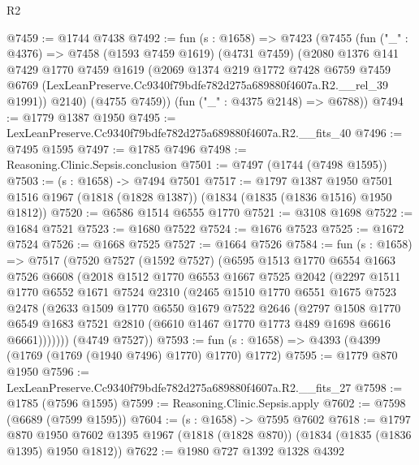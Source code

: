 \begin{lexlean}{R2}
\begin{coremodule}
@7459 := @1744 @7438
@7492 := fun (s : @1658) =>
  @7423
    (@7455
      (fun ("_" : @4376) =>
      @7458
        (@1593 @7459 @1619)
        (@4731 @7459)
        (@2080
          @1376
          @141
          @7429
          @1770
          @7459
          @1619
          (@2069
            @1374
            @219
            @1772
            @7428
            @6759
            @7459
            @6769
            (LexLeanPreserve.Cc9340f79bdfe782d275a689880f4607a.R2.__rel_39 @1991))
          @2140)
        (@4755 @7459))
      (fun ("_" : @4375 @2148) => @6788))
@7494 := @1779 @1387 @1950
@7495 := LexLeanPreserve.Cc9340f79bdfe782d275a689880f4607a.R2.__fits_40
@7496 := @7495 @1595
@7497 := @1785 @7496
@7498 := Reasoning.Clinic.Sepsis.conclusion
@7501 := @7497 (@1744 (@7498 @1595))
@7503 := (s : @1658) -> @7494 @7501
@7517 := @1797
    @1387
    @1950
    @7501
    @1516
    @1967
    (@1818 (@1828 @1387))
    (@1834 (@1835 (@1836 @1516) @1950 @1812))
@7520 := @6586 @1514 @6555 @1770
@7521 := @3108 @1698
@7522 := @1684 @7521
@7523 := @1680 @7522
@7524 := @1676 @7523
@7525 := @1672 @7524
@7526 := @1668 @7525
@7527 := @1664 @7526
@7584 := fun (s : @1658) =>
  @7517
    (@7520
      @7527
      (@1592 @7527)
      (@6595
        @1513
        @1770
        @6554
        @1663
        @7526
        @6608
        (@2018
          @1512
          @1770
          @6553
          @1667
          @7525
          @2042
          (@2297
            @1511
            @1770
            @6552
            @1671
            @7524
            @2310
            (@2465
              @1510
              @1770
              @6551
              @1675
              @7523
              @2478
              (@2633
                @1509
                @1770
                @6550
                @1679
                @7522
                @2646
                (@2797
                  @1508
                  @1770
                  @6549
                  @1683
                  @7521
                  @2810
                  (@6610 @1467 @1770 @1773 @489 @1698 @6616 @6661)))))))
      (@4749 @7527))
@7593 := fun (s : @1658) => @4393 (@4399 (@1769 (@1769 (@1940 @7496) @1770) @1770) @1772)
@7595 := @1779 @870 @1950
@7596 := LexLeanPreserve.Cc9340f79bdfe782d275a689880f4607a.R2.__fits_27
@7598 := @1785 (@7596 @1595)
@7599 := Reasoning.Clinic.Sepsis.apply
@7602 := @7598 (@6689 (@7599 @1595))
@7604 := (s : @1658) -> @7595 @7602
@7618 := @1797
    @870
    @1950
    @7602
    @1395
    @1967
    (@1818 (@1828 @870))
    (@1834 (@1835 (@1836 @1395) @1950 @1812))
@7622 := @1980 @727 @1392 @1328 @4392

\end{coremodule}
\end{lexlean}
